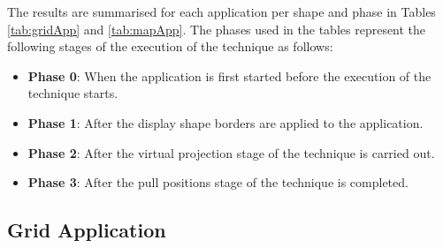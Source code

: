 \documentclass[twocolumn,compsoc]{cvm}
\begin{document}
{The results are summarised for each application per shape and phase in Tables \ref{tab:gridApp} and \ref{tab:mapApp}.
The phases used in the tables represent the following stages of the execution of the technique as follows:
\begin{itemize}
  \item \textbf{Phase 0}: 
  When the application is first started before the execution of the technique starts.
  \item \textbf{Phase 1}: 
  After the display shape borders are applied to the application.
  \item \textbf{Phase 2}: 
  After the virtual projection stage of the technique is carried out.
  \item \textbf{Phase 3}: 
  After the pull positions stage of the technique is completed.
\end{itemize}

\subsection{Grid Application}
\label{subsec:gridresults} 

}
\end{document}
